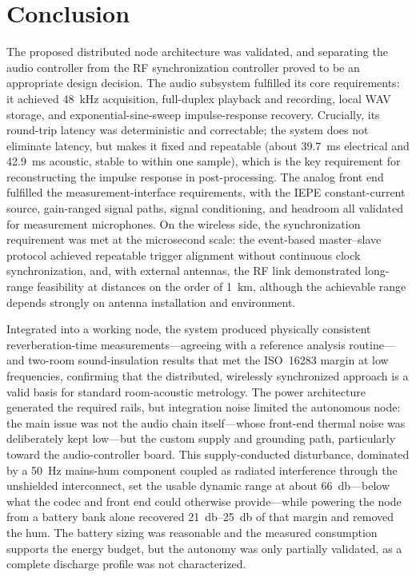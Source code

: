 \chapter{Conclusion}
\label{chap:conclusion}

The proposed distributed node architecture was validated, and separating the audio controller from the RF synchronization controller proved to be an appropriate design decision. The audio subsystem fulfilled its core requirements: it achieved \SI{48}{\kilo\hertz} acquisition, full-duplex playback and recording, local WAV storage, and exponential-sine-sweep impulse-response recovery. Crucially, its round-trip latency was deterministic and correctable; the system does not eliminate latency, but makes it fixed and repeatable (about \SI{39.7}{\milli\second} electrical and \SI{42.9}{\milli\second} acoustic, stable to within one sample), which is the key requirement for reconstructing the impulse response in post-processing. The analog front end fulfilled the measurement-interface requirements, with the IEPE constant-current source, gain-ranged signal paths, signal conditioning, and headroom all validated for measurement microphones. On the wireless side, the synchronization requirement was met at the microsecond scale: the event-based master--slave protocol achieved repeatable trigger alignment without continuous clock synchronization, and, with external antennas, the RF link demonstrated long-range feasibility at distances on the order of \SI{1}{\kilo\meter}, although the achievable range depends strongly on antenna installation and environment.

Integrated into a working node, the system produced physically consistent reverberation-time measurements---agreeing with a reference analysis routine---and two-room sound-insulation results that met the ISO~16283 margin at low frequencies, confirming that the distributed, wirelessly synchronized approach is a valid basis for standard room-acoustic metrology. The power architecture generated the required rails, but integration noise limited the autonomous node: the main issue was not the audio chain itself---whose front-end thermal noise was deliberately kept low---but the custom supply and grounding path, particularly toward the audio-controller board. This supply-conducted disturbance, dominated by a \SI{50}{\hertz} mains-hum component coupled as radiated interference through the unshielded interconnect, set the usable dynamic range at about \SI{66}{\decibel}---below what the codec and front end could otherwise provide---while powering the node from a battery bank alone recovered \SIrange{21}{25}{\decibel} of that margin and removed the hum. The battery sizing was reasonable and the measured consumption supports the energy budget, but the autonomy was only partially validated, as a complete discharge profile was not characterized.


